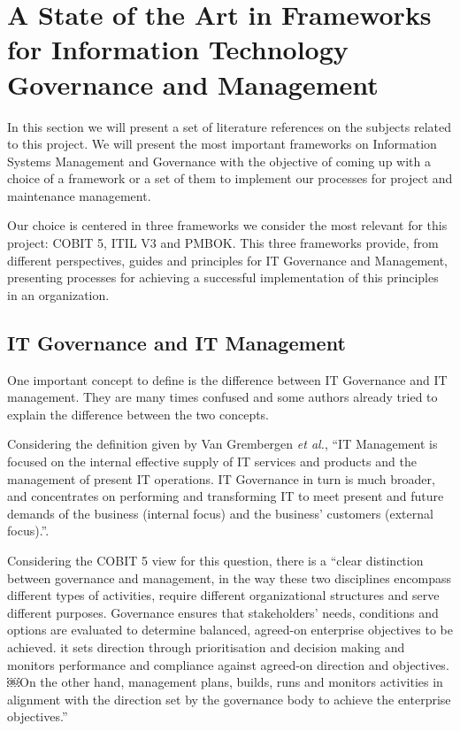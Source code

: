 
% 
% 


\section{A State of the Art in Frameworks for Information Technology Governance and Management}

In this section we will present a set of literature references on the subjects related to this project. We will present the most important frameworks on Information Systems Management and Governance with the objective of coming up with a choice of a framework or a set of them to implement our processes for project and maintenance management.\par
Our choice is centered in three frameworks we consider the most relevant for this project: COBIT 5, ITIL V3 and PMBOK. This three frameworks provide, from different perspectives, guides and principles for IT Governance and Management, presenting processes for achieving a successful implementation of this principles in an organization.

\subsection{IT Governance and IT Management}

One important concept to define is the difference between IT Governance and IT management. They are many times confused and some authors already tried to explain the difference between the two concepts.\par
Considering the definition given by Van Grembergen \textit{et al.}, ``IT Management is focused on the internal effective supply of IT services and products and the management of present IT operations. IT Governance in turn is much broader, and concentrates on performing and transforming IT to meet present and future demands of the business (internal focus) and the business' customers (external focus).''.\par
 Considering the COBIT 5 view for this question, there is a ``clear distinction between governance and management, in the way these two disciplines encompass different types of activities, require different organizational structures and serve different purposes. Governance ensures that stakeholders' needs, conditions and options are evaluated to determine balanced, agreed-on enterprise objectives to be achieved. it sets direction through prioritisation and decision making and monitors performance and compliance against agreed-on direction and objectives.￼On the other hand, management plans, builds, runs and monitors activities in alignment with the direction set by the governance body to achieve the enterprise objectives.''\cite{2012cobit}\par



